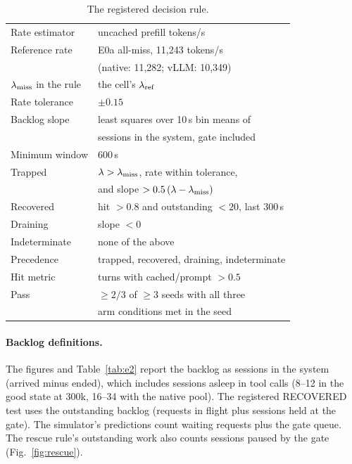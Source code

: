 \begin{table}[htbp]
\centering\footnotesize
\caption{The registered decision rule.}\label{tab:rule}
\begin{tabular}{@{}l l@{}}
\toprule
Rate estimator & uncached prefill tokens/s\\
Reference rate & E0a all-miss, 11,243 tokens/s\\
 & \quad (native: 11,282; vLLM: 10,349)\\
$\lambda_{\mathrm{miss}}$ in the rule & the cell's $\lambda_{\mathrm{ref}}$\\
Rate tolerance & $\pm0.15$\\
Backlog slope & least squares over 10\,s bin means of\\
 & \quad sessions in the system, gate included\\
Minimum window & 600\,s\\
Trapped & $\lambda>\lambda_{\mathrm{miss}}$, rate within tolerance,\\
 & \quad and slope $>0.5\,(\lambda-\lambda_{\mathrm{miss}})$\\
Recovered & hit $>0.8$ and outstanding $<20$, last 300\,s\\
Draining & slope $<0$\\
Indeterminate & none of the above\\
Precedence & trapped, recovered, draining, indeterminate\\
Hit metric & turns with cached/prompt $>0.5$\\
Pass & $\ge2/3$ of $\ge3$ seeds with all three\\
 & \quad arm conditions met in the seed\\
\bottomrule
\end{tabular}
\end{table}

\paragraph{Backlog definitions.} The figures and Table~\ref{tab:e2} report the backlog as sessions in the system (arrived minus ended), which includes sessions asleep in tool calls (8--12 in the good state at 300k, 16--34 with the native pool). The registered RECOVERED test uses the outstanding backlog (requests in flight plus sessions held at the gate). The simulator's predictions count waiting requests plus the gate queue. The rescue rule's outstanding work also counts sessions paused by the gate (Fig.~\ref{fig:rescue}).

